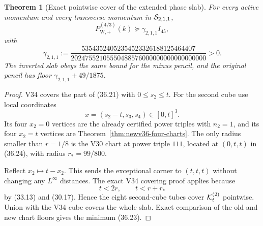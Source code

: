 \documentclass[11pt,oneside]{article}
\newtheorem{theorem}{Theorem}[section]
\theoremstyle{definition}
\theoremstyle{remark}
\begin{document}
\begin{theorem}[Exact pointwise cover of the extended phase slab]
\label{thm:newv36-slab-cover}
For every active momentum and every transverse momentum in
\({\cal S}_{2,1,1}\),
\[
 P_{\mathrm W,+}^{(4/3)}(k)
 \succeq\gamma_{2,1,1}I_{45},                         \tag{36.22}
\]
with
\[
 \gamma_{2,1,1}:=
\frac{53543524052354523326188125464407}
{20247552105550488576000000000000000000}>0.           \tag{36.23}
\]
The inverted slab obeys the same bound for the minus pencil, and the
original pencil has floor \(\gamma_{2,1,1}+49/1875\).
\end{theorem}

\begin{proof}
V34 covers the part of (36.21) with \(0\le s_2\le t\).
For the second cube use local coordinates
\[
 x=(s_2-t,s_3,s_4)\in[0,t]^3.                         \tag{36.24}
\]
Its four \(x_2=0\) vertices are the already certified power triples
with \(n_2=1\), and its four \(x_2=t\) vertices are
Theorem~\ref{thm:newv36-four-charts}.  The only radius smaller than
\(r=1/8\) is the V30 chart at power triple \(111\), located at
\((0,t,t)\) in (36.24), with radius \(r_*=99/800\).

Reflect \(x_2\mapsto t-x_2\).  This sends the exceptional corner to
\((t,t,t)\) without changing any \(L^\infty\) distances.  The exact
V34 covering proof applies because
\[
 t<2r,\qquad t<r+r_*                                  \tag{36.25}
\]
by (33.13) and (30.17).  Hence the eight second-cube tubes cover
\({\cal K}^{(2)}_t\) pointwise.  Union with the V34 cube covers the
whole slab.  Exact comparison of the old and new chart floors gives
the minimum (36.23).
\end{proof}
\end{document}
